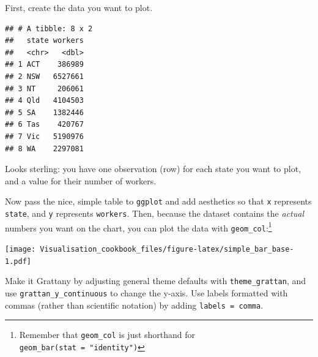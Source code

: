 \documentclass[]{book}
\newenvironment{Shaded}{\begin{snugshade}}{\end{snugshade}}
\newcommand{\DataTypeTok}[1]{\textcolor[rgb]{0.13,0.29,0.53}{#1}}
\newcommand{\DecValTok}[1]{\textcolor[rgb]{0.00,0.00,0.81}{#1}}
\newcommand{\KeywordTok}[1]{\textcolor[rgb]{0.13,0.29,0.53}{\textbf{#1}}}
\newcommand{\NormalTok}[1]{#1}
\newcommand{\OperatorTok}[1]{\textcolor[rgb]{0.81,0.36,0.00}{\textbf{#1}}}
\newcommand{\StringTok}[1]{\textcolor[rgb]{0.31,0.60,0.02}{#1}}
\let\rmarkdownfootnote\footnote%
\def\footnote{\protect\rmarkdownfootnote}
\begin{document}
First, create the data you want to plot.

\begin{Shaded}
\end{Shaded}

\begin{verbatim}
## # A tibble: 8 x 2
##   state workers
##   <chr>   <dbl>
## 1 ACT    386989
## 2 NSW   6527661
## 3 NT     206061
## 4 Qld   4104503
## 5 SA    1382446
## 6 Tas    420767
## 7 Vic   5190976
## 8 WA    2297081
\end{verbatim}

Looks sterling: you have one observation (row) for each state you want to plot, and a value for their number of workers.

Now pass the nice, simple table to \texttt{ggplot} and add aesthetics so that \texttt{x} represents \texttt{state}, and \texttt{y} represents \texttt{workers}. Then, because the dataset contains the \emph{actual} numbers you want on the chart, you can plot the data with \texttt{geom\_col}:\footnote{Remember that \texttt{geom\_col} is just shorthand for \texttt{geom\_bar(stat\ =\ "identity")}}

\begin{Shaded}
\end{Shaded}

\texttt{[image: Visualisation\_cookbook\_files/figure-latex/simple\_bar\_base-1.pdf]}

Make it Grattany by adjusting general theme defaults with \texttt{theme\_grattan}, and use \texttt{grattan\_y\_continuous} to change the y-axis. Use labels formatted with commas (rather than scientific notation) by adding \texttt{labels\ =\ comma}.
\end{document}
